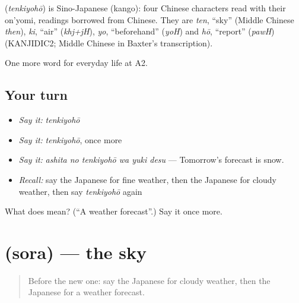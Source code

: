 \begin{cousinweb}
\textbf{} (\emph{tenkiyohō}) is Sino-Japanese (kango): four Chinese characters read with their on'yomi, readings borrowed from Chinese. They are \emph{ten}, \textquotedblleft{}sky\textquotedblright{} (Middle Chinese \emph{then}), \emph{ki}, \textquotedblleft{}air\textquotedblright{} (\emph{khj+jH}), \emph{yo}, \textquotedblleft{}beforehand\textquotedblright{} (\emph{yoH}) and \emph{hō}, \textquotedblleft{}report\textquotedblright{} (\emph{pawH}) (KANJIDIC2; Middle Chinese in Baxter's transcription).
\end{cousinweb}

\begin{grammarlens}[title={What you've built}]
One more word for everyday life at A2.
\end{grammarlens}

\subsection*{Your turn}
\begin{itemize}
\raggedright
  \item \emph{Say it:} \emph{tenkiyohō}
  \item \emph{Say it:} \emph{tenkiyohō}, once more
  \item \emph{Say it:} \emph{ashita no tenkiyohō wa yuki desu} — Tomorrow's forecast is snow.
  \item \emph{Recall:} say the Japanese for fine weather, then the Japanese for cloudy weather, then say \emph{tenkiyohō} again
\end{itemize}

\begin{tcolorbox}[breakable,colback=teal!4,colframe=teal!35!black,title={Before you move on}]
What does  mean? (\textquotedblleft{}A weather forecast\textquotedblright{}.) Say it once more.
\end{tcolorbox}
\section[\texorpdfstring{\ja{そら} (sora)}{そら (sora)}]{ (sora) — the sky}

\label{lesson:JA-C208-sora}



\begin{quote}
Before the new one: say the Japanese for cloudy weather, then the Japanese for a weather forecast.
\end{quote}

